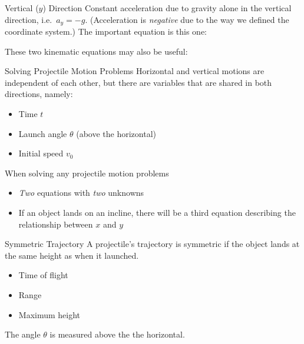 \documentclass[12pt,compress,aspectratio=169]{beamer}
\newcommand{\eq}[2]{\vspace{#1}{\Large\begin{displaymath}#2\end{displaymath}}}
\begin{document}
\begin{frame}{Vertical ($y$) Direction}
  Constant acceleration due to gravity alone in the vertical direction, i.e.\
  $a_y=-g$. (Acceleration is \emph{negative} due to the way we defined the
  coordinate system.) The important equation is this one:

  \eq{-.2in}{
    y = \left[v_0\sin\theta\right]t-\frac12gt^2
  }

  These two kinematic equations may also be useful:

  \vspace{-.2in}{\Large
    \begin{align*}
      v_y &= \left[v_0\sin\theta\right] -gt\\
      v_y^2&=\left[v_0\sin\theta\right]^2-2gy
    \end{align*}
  }
\end{frame}



\begin{frame}{Solving Projectile Motion Problems}
  Horizontal and vertical motions are independent of each other, but there are
  variables that are shared in both directions, namely:
  \begin{itemize}
  \item Time $t$
  \item Launch angle $\theta$ (above the horizontal)
  \item Initial speed $v_0$
  \end{itemize}
  
  \vspace{.2in}When solving any projectile motion problems
  \begin{itemize}
  \item \emph{Two} equations with \emph{two} unknowns
  \item If an object lands on an incline, there will be a third equation
    describing the relationship between $x$ and $y$
  \end{itemize}
\end{frame}



\begin{frame}{Symmetric Trajectory}
  A projectile's trajectory is symmetric if the object lands at the same height
  as when it launched.
  \begin{itemize}
  \item Time of flight
    \eq{-.1in}{t_\mathrm{max}=\frac{2v_0\sin\theta}{g}}
  \item Range
    \eq{-.1in}{R=\frac{v_0^2\sin(2\theta)}{g}}
  \item Maximum height
    \eq{-.1in}{y_\mathrm{max}=\frac{v_0^2\sin^2\theta}{2g}}
  \end{itemize}
  The angle $\theta$ is measured above the the horizontal.
\end{frame}
\end{document}

